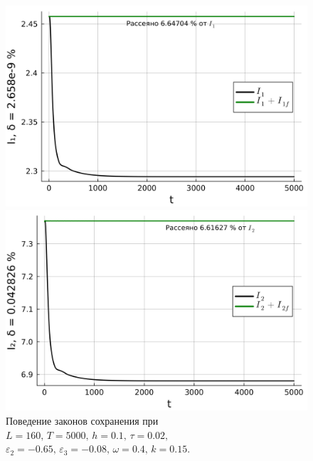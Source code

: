 \documentclass[14pt,a4paper]{extreport}
\begin{document}
			\begin{figure}[H] %
				\begin{center}
					\begin{minipage}[h]{0.48\linewidth}
						\includegraphics[width=1\linewidth]{fig80.png}
					\end{minipage}
					\hfill
					\begin{minipage}[h]{0.48\linewidth}
						\includegraphics[width=1\linewidth]{fig81.png}
					\end{minipage}
				\end{center}
				\caption{Поведение законов сохранения при
				\(L=160,\, T=5000,\, h=0.1,\, \tau=0.02,\)
				\(\varepsilon_{2}=-0.65,\,\varepsilon_{3}=-0.08,\, \omega=0.4,\, k=0.15\).}
				\label{fig340-8}
			\end{figure}
\end{document}

